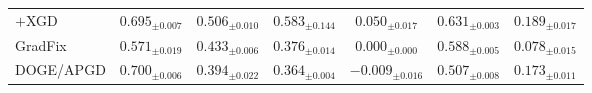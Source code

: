 \documentclass{article} %
\begin{document}
\begin{table}[t]
\begin{tabular}{lcccccc}
\quad $+$XGD             & $0.695_{\pm0.007}$ & $0.506_{\pm0.010}$ & $0.583_{\pm0.144}$ & $0.050_{\pm0.017}$ & $0.631_{\pm0.003}$ & $0.189_{\pm0.017}$ \\
GradFix                  & $0.571_{\pm0.019}$ & $0.433_{\pm0.006}$ & $0.376_{\pm0.014}$ & $0.000_{\pm0.000}$ & $0.588_{\pm0.005}$ & $0.078_{\pm0.015}$ \\
DOGE/APGD                & $0.700_{\pm0.006}$ & $0.394_{\pm0.022}$ & $0.364_{\pm0.004}$ & $-0.009_{\pm0.016}$ & $0.507_{\pm0.008}$ & $0.173_{\pm0.011}$ \\
\bottomrule
\end{tabular}
\end{table}

\iffalse
\end{document}
